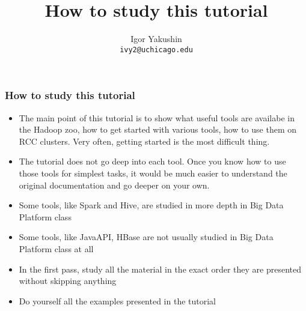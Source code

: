 \documentclass{beamer}
\title{\huge{How to study this tutorial}}
\author{Igor Yakushin \\ \texttt{ivy2@uchicago.edu}}
\date{}
\newcommand{\RCCLogo}{
\begin{textblock}{14}(1.5,1.5)
  \pgfuseimage{logo_rcc}
\end{textblock}
}
\begin{document}



\begin{frame}
\titlepage
\end{frame}

\begin{frame}[fragile]
  \frametitle{How to study this tutorial}
  \begin{itemize}
  \item The main point of this tutorial is to show what useful tools are availabe in the Hadoop zoo,
    how to get started with various tools, how to use them on RCC
    clusters. Very often, getting started is the most difficult thing.
    
  \item The tutorial does not go deep into each tool. Once you know how to use those tools for simplest tasks, it would be much easier
    to understand the original documentation and go deeper on your own.
  \item Some tools, like Spark and Hive, are studied in more depth in Big
    Data Platform class
  \item Some tools, like JavaAPI, HBase are not usually studied in Big Data Platform class at all
  \item In the first pass, study all the material in the exact order they are presented without skipping anything
  \item Do yourself all the examples presented in the tutorial
  \end{itemize}
\end{frame}
\end{document}
